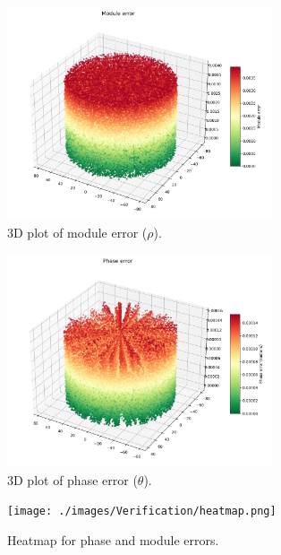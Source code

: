 \begin{figure}[H]
    \centering
    \includegraphics[width=0.7\textwidth]{./images/Verification/module_error.png}
    \caption{3D plot of module error (\( \rho \)).}
    \label{fig:module_error}
\end{figure}

\begin{figure}[H]
    \centering
    \includegraphics[width=0.7\textwidth]{./images/Verification/phase_error.png}
    \caption{3D plot of phase error (\( \theta \)).}
    \label{fig:phase_error}
\end{figure}

\begin{figure}[H]
    \centering
    \texttt{[image: ./images/Verification/heatmap.png]}
    \caption{Heatmap for phase and module errors.}
    \label{fig:heatmap_error}
\end{figure}

